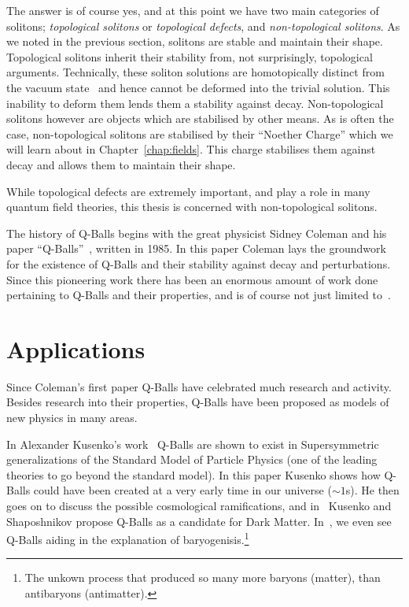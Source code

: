 The answer is of course yes, and at this point we have two main categories of
solitons; \textit{topological solitons} or \textit{topological defects}, and
\textit{non-topological solitons}. As we noted in the previous section,
solitons are stable and maintain their shape. Topological solitons inherit
their stability from, not surprisingly, topological arguments. Technically,
these soliton solutions are homotopically distinct from the vacuum
state~\cite{nakahara} and hence cannot be deformed into the trivial solution.
This inability to deform them lends them a stability against decay.
Non-topological solitons however are objects which are stabilised by other
means. As is often the case, non-topological solitons are stabilised by their
``Noether Charge'' which we will learn about in Chapter~\ref{chap:fields}. This
charge stabilises them against decay and allows them to maintain their shape.

While topological defects are extremely important, and play a role in many
quantum field theories, this thesis is concerned with non-topological solitons.

The history of Q-Balls begins with the great physicist Sidney Coleman and his
paper ``Q-Balls''~\cite{coleman}, written in 1985. In this paper Coleman lays
the groundwork for the existence of Q-Balls and their stability against decay
and perturbations. Since this pioneering work there has been an enormous amount
of work done pertaining to Q-Balls and their properties, and is of course not
just limited
to~\cite{qball1,qball2,qball3,qball4,qball5,qball6,qball7,qball8,qball9}.

\section{Applications}\label{sec:apps}
Since Coleman's first paper Q-Balls have celebrated much research and activity.
Besides research into their properties, Q-Balls have been proposed as models of
new physics in many areas.

In Alexander Kusenko's work~\cite{SUSY} Q-Balls are shown to exist in
Supersymmetric generalizations of the Standard Model of Particle Physics (one
of the leading theories to go beyond the standard model). In this paper Kusenko
shows how Q-Balls could have been created at a very early time in our universe
(\(\sim1\)s). He then goes on to discuss the possible cosmological ramifications,
and in~\cite{darkmatter} Kusenko and Shaposhnikov propose Q-Balls as a candidate
for Dark Matter. In~\cite{baryogen,baryogen2}, we even see Q-Balls aiding in
the explanation of baryogenisis.\footnote{The unkown process that produced so
many more baryons (matter), than antibaryons (antimatter).}
